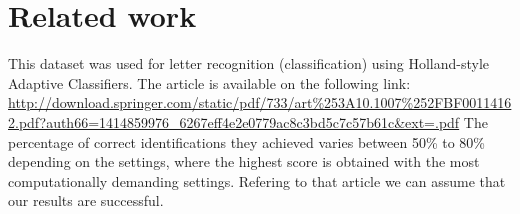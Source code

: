 \section*{Related work}
This dataset was used for letter recognition (classification) using Holland-style Adaptive Classifiers. The article is available on the following link: \\
\url{http://download.springer.com/static/pdf/733/art%253A10.1007%252FBF00114162.pdf?auth66=1414859976_6267eff4e2e0779ac8c3bd5c7c57b61c&ext=.pdf} 
The percentage of correct identifications they achieved varies between 50\% to 80\% depending on the settings, where the highest score is
obtained with the most computationally demanding settings. Refering to that article we can assume that our results are successful. 





